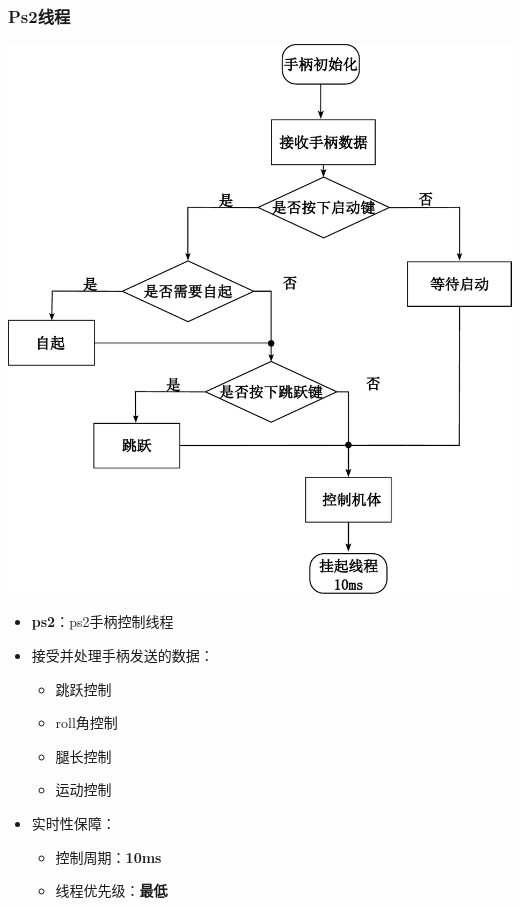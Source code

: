 \documentclass{beamer}
\begin{document}
		\begin{frame}
		\frametitle{Ps2线程}
		\begin{minipage}[t]{0.5\linewidth}
			\vspace{-\baselineskip} %
			\centering
			\includegraphics[width=1.1\linewidth]{img/chapter5/ps2.pdf} %
		\end{minipage}%
		\hfill %
		\begin{minipage}[t]{0.4\linewidth}
			\begin{itemize}
				\item \textbf{ps2}：ps2手柄控制线程
				\item 接受并处理手柄发送的数据：
				\begin{itemize}
					\item 跳跃控制
					\item roll角控制
					\item 腿长控制
					\item 运动控制
				\end{itemize}
				\item 实时性保障：
				\begin{itemize}
					\item 控制周期：\textbf{10ms}
					\item 线程优先级：\textbf{最低}
				\end{itemize}
			\end{itemize}
		\end{minipage}
	\end{frame}
\end{document}
